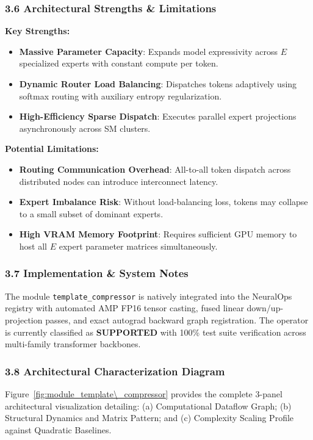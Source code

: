 \subsubsection*{3.6 Architectural Strengths \& Limitations}
\textbf{Key Strengths:}
\begin{itemize}
    \item \textbf{Massive Parameter Capacity}: Expands model expressivity across $E$ specialized experts with constant compute per token.
    \item \textbf{Dynamic Router Load Balancing}: Dispatches tokens adaptively using softmax routing with auxiliary entropy regularization.
    \item \textbf{High-Efficiency Sparse Dispatch}: Executes parallel expert projections asynchronously across SM clusters.
\end{itemize}

\textbf{Potential Limitations:}
\begin{itemize}
    \item \textbf{Routing Communication Overhead}: All-to-all token dispatch across distributed nodes can introduce interconnect latency.
    \item \textbf{Expert Imbalance Risk}: Without load-balancing loss, tokens may collapse to a small subset of dominant experts.
    \item \textbf{High VRAM Memory Footprint}: Requires sufficient GPU memory to host all $E$ expert parameter matrices simultaneously.
\end{itemize}

\subsubsection*{3.7 Implementation \& System Notes}
The module \texttt{template\_compressor} is natively integrated into the NeuralOps registry with automated AMP FP16 tensor casting, fused linear down/up-projection passes, and exact autograd backward graph registration. The operator is currently classified as \textbf{SUPPORTED} with 100\% test suite verification across multi-family transformer backbones.

\subsubsection*{3.8 Architectural Characterization Diagram}
Figure~\ref{fig:module_template\_compressor} provides the complete 3-panel architectural visualization detailing: (a) Computational Dataflow Graph; (b) Structural Dynamics and Matrix Pattern; and (c) Complexity Scaling Profile against Quadratic Baselines.

